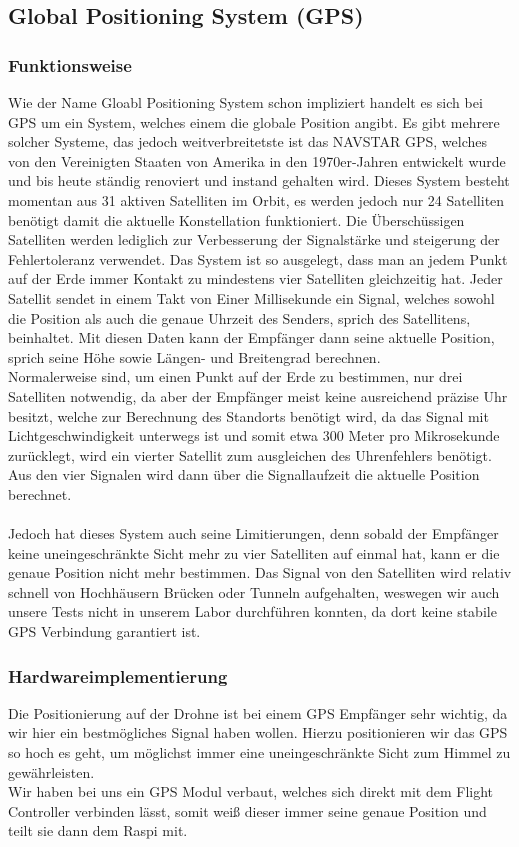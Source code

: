 \subsection{Global Positioning System (GPS)}
\subsubsection{Funktionsweise}
Wie der Name Gloabl Positioning System schon impliziert handelt es sich bei GPS um ein System, welches einem die globale Position angibt. Es gibt mehrere solcher Systeme, das jedoch weitverbreitetste ist das NAVSTAR GPS, welches von den Vereinigten Staaten von Amerika in den 1970er-Jahren entwickelt wurde und bis heute ständig renoviert und instand gehalten wird. Dieses System besteht momentan aus 31 aktiven Satelliten im Orbit, es werden jedoch nur 24 Satelliten benötigt damit die aktuelle Konstellation funktioniert. Die Überschüssigen Satelliten werden lediglich zur Verbesserung der Signalstärke und steigerung der Fehlertoleranz verwendet. Das System ist so ausgelegt, dass man an jedem Punkt auf der Erde immer Kontakt zu mindestens vier Satelliten gleichzeitig hat. Jeder Satellit sendet in einem Takt von Einer Millisekunde ein Signal, welches sowohl die Position als auch die genaue Uhrzeit des Senders, sprich des Satellitens, beinhaltet. Mit diesen Daten kann der Empfänger dann seine aktuelle Position, sprich seine Höhe sowie Längen- und Breitengrad berechnen.\\ Normalerweise sind, um einen Punkt auf der Erde zu bestimmen, nur drei Satelliten notwendig, da aber der Empfänger meist keine ausreichend präzise Uhr besitzt, welche zur Berechnung des Standorts benötigt wird, da das Signal mit Lichtgeschwindigkeit unterwegs ist und somit etwa 300 Meter pro Mikrosekunde zurücklegt, wird ein vierter Satellit zum ausgleichen des Uhrenfehlers benötigt. Aus den vier Signalen wird dann über die Signallaufzeit die aktuelle Position berechnet.
\\
\\
Jedoch hat dieses System auch seine Limitierungen, denn sobald der Empfänger keine uneingeschränkte Sicht mehr zu vier Satelliten auf einmal hat, kann er die genaue Position nicht mehr bestimmen. Das Signal von den Satelliten wird relativ schnell von Hochhäusern Brücken oder Tunneln aufgehalten, weswegen wir auch unsere Tests nicht in unserem Labor durchführen konnten, da dort keine stabile GPS Verbindung garantiert ist.

\subsubsection{Hardwareimplementierung}
Die Positionierung auf der Drohne ist bei einem GPS Empfänger sehr wichtig, da wir hier ein bestmögliches Signal haben wollen. Hierzu positionieren wir das GPS so hoch es geht, um möglichst immer eine uneingeschränkte Sicht zum Himmel zu gewährleisten.\\
Wir haben bei uns ein GPS Modul verbaut, welches sich direkt mit dem Flight Controller verbinden lässt, somit weiß dieser immer seine genaue Position und teilt sie dann dem Raspi mit.

